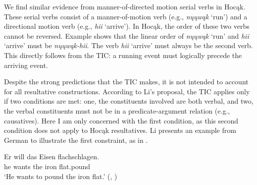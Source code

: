 \documentclass[output=paper]{LSP/langsci}
\begin{document}
We find similar evidence from manner-of-directed motion serial verbs in Hocąk. These serial verbs consist of a manner-of-motion verb (e.g., \textit{nųųwąk} `run') and a directional motion verb (e.g., \textit{hii} `arrive'). In Hocąk, the order of these two verbs cannot be reversed. Example  shows that the linear order of \textit{nųųwąk} `run' and \textit{hii} `arrive' must be \textit{nųųwąk-hii}. The verb \textit{hii} `arrive' must always be the second verb. This directly follows from the TIC: a running event must logically precede the arriving event.

\begin{exe}
\ex
\begin{xlist}



\end{xlist}
\end{exe}

Despite the strong predictions that the TIC makes, it is not intended to account for all resultative constructions. According to Li's proposal, the TIC applies only if two conditions are met: one, the constituents involved are both verbal, and two, the verbal constituents must not be in a predicate-argument relation (e.g., causatives). Here I am only concerned with the first condition, as this second condition does not apply to Hocąk resultatives. Li presents an example from German to illustrate the first constraint, as in .

\begin{exe}

\ex \gll Er will das Eisen flachschlagen.\\
he wants the iron flat.pound\\
\glt `He wants to pound the iron flat.' (\citealt[501]{Li1993}, )

\end{exe}
\end{document}
